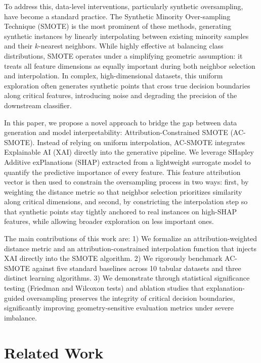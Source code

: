 \documentclass[conference,a4paper]{IEEEtran}
\begin{document}
To address this, data-level interventions, particularly synthetic oversampling, have become a standard practice. The Synthetic Minority Over-sampling Technique (SMOTE) \cite{chawla2002smote} is the most prominent of these methods, generating synthetic instances by linearly interpolating between existing minority samples and their $k$-nearest neighbors. While highly effective at balancing class distributions, SMOTE operates under a simplifying geometric assumption: it treats all feature dimensions as equally important during both neighbor selection and interpolation. In complex, high-dimensional datasets, this uniform exploration often generates synthetic points that cross true decision boundaries along critical features, introducing noise and degrading the precision of the downstream classifier.

In this paper, we propose a novel approach to bridge the gap between data generation and model interpretability: Attribution-Constrained SMOTE (AC-SMOTE). Instead of relying on uniform interpolation, AC-SMOTE integrates Explainable AI (XAI) directly into the generative pipeline. We leverage SHapley Additive exPlanations (SHAP) \cite{lundberg2017unified} extracted from a lightweight surrogate model to quantify the predictive importance of every feature. This feature attribution vector is then used to constrain the oversampling process in two ways: first, by weighting the distance metric so that neighbor selection prioritizes similarity along critical dimensions, and second, by constricting the interpolation step so that synthetic points stay tightly anchored to real instances on high-SHAP features, while allowing broader exploration on less important ones.

The main contributions of this work are:
1) We formalize an attribution-weighted distance metric and an attribution-constrained interpolation function that injects XAI directly into the SMOTE algorithm.
2) We rigorously benchmark AC-SMOTE against five standard baselines across 10 tabular datasets and three distinct learning algorithms.
3) We demonstrate through statistical significance testing (Friedman and Wilcoxon tests) and ablation studies that explanation-guided oversampling preserves the integrity of critical decision boundaries, significantly improving geometry-sensitive evaluation metrics under severe imbalance.

\section{Related Work}
\end{document}
